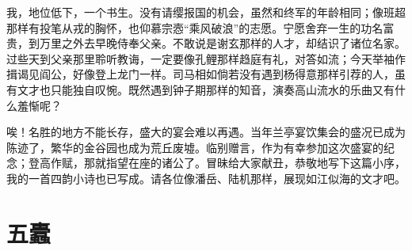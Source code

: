 \documentclass[12pt,UTF-8,openany]{ctexbook}
\begin{document}
\begin{normalsize}
    我，地位低下，一个书生。没有请缨报国的机会，虽然和终军的年龄相同；像班超那样有投笔从戎的胸怀，也仰慕宗悫“乘风破浪”的志愿。宁愿舍弃一生的功名富贵，到万里之外去早晚侍奉父亲。不敢说是谢玄那样的人才，却结识了诸位名家。过些天到父亲那里聆听教诲，一定要像孔鲤那样趋庭有礼，对答如流；今天举袖作揖谒见阎公，好像登上龙门一样。司马相如倘若没有遇到杨得意那样引荐的人，虽有文才也只能独自叹惋。既然遇到钟子期那样的知音，演奏高山流水的乐曲又有什么羞惭呢？
    
    唉！名胜的地方不能长存，盛大的宴会难以再遇。当年兰亭宴饮集会的盛况已成为陈迹了，繁华的金谷园也成为荒丘废墟。临别赠言，作为有幸参加这次盛宴的纪念；登高作赋，那就指望在座的诸公了。冒昧给大家献丑，恭敬地写下这篇小序，我的一首四韵小诗也已写成。请各位像潘岳、陆机那样，展现如江似海的文才吧。
    
\end{normalsize}



\chapter{五蠹}
\end{document}
